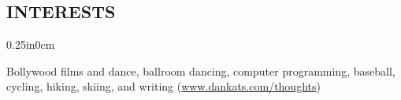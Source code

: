 \documentclass[11pt]{article}
\newcommand{\mysec}[1]{\subsection*{\uppercase{#1}}}
\newcommand{\blockindent}{0.25in}
\begin{document}

\vspace{-3pt}
\mysec{Interests}
\begin{adjustwidth}{\blockindent}{0cm}

	Bollywood films and dance, ballroom dancing, computer programming, baseball, cycling, hiking, skiing, and writing (\href{http://www.dankats.com/thoughts}{www.dankats.com/thoughts})

\end{adjustwidth}
\end{document}
